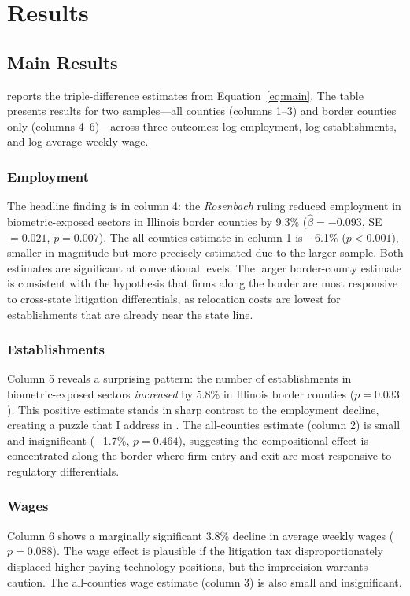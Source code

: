 \documentclass[12pt]{article}
\begin{document}
\section{Results}
\label{sec:results}

\subsection{Main Results}

 reports the triple-difference estimates from Equation~\eqref{eq:main}. The table presents results for two samples---all counties (columns 1--3) and border counties only (columns 4--6)---across three outcomes: log employment, log establishments, and log average weekly wage.

\subsubsection*{Employment} The headline finding is in column 4: the \emph{Rosenbach} ruling reduced employment in biometric-exposed sectors in Illinois border counties by 9.3\% ($\hat{\beta} = -0.093$, SE $= 0.021$, $p = 0.007$). The all-counties estimate in column 1 is $-$6.1\% ($p < 0.001$), smaller in magnitude but more precisely estimated due to the larger sample. Both estimates are significant at conventional levels. The larger border-county estimate is consistent with the hypothesis that firms along the border are most responsive to cross-state litigation differentials, as relocation costs are lowest for establishments that are already near the state line.

\subsubsection*{Establishments} Column 5 reveals a surprising pattern: the number of establishments in biometric-exposed sectors \emph{increased} by 5.8\% in Illinois border counties ($p = 0.033$). This positive estimate stands in sharp contrast to the employment decline, creating a puzzle that I address in . The all-counties estimate (column 2) is small and insignificant ($-$1.7\%, $p = 0.464$), suggesting the compositional effect is concentrated along the border where firm entry and exit are most responsive to regulatory differentials.

\subsubsection*{Wages} Column 6 shows a marginally significant 3.8\% decline in average weekly wages ($p = 0.088$). The wage effect is plausible if the litigation tax disproportionately displaced higher-paying technology positions, but the imprecision warrants caution. The all-counties wage estimate (column 3) is also small and insignificant.
\end{document}
